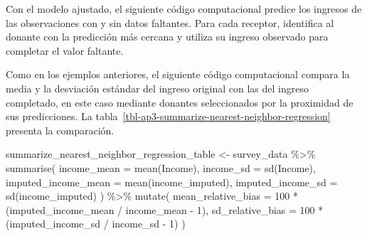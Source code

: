 \documentclass[
  spanish,
  11pt,
  letterpaper,
  oneside,
  open=any]{scrbook}
\newenvironment{Shaded}{\begin{snugshade}}{\end{snugshade}}
\newcommand{\AttributeTok}[1]{\textcolor[rgb]{0.40,0.45,0.13}{#1}}
\newcommand{\ControlFlowTok}[1]{\textcolor[rgb]{0.00,0.23,0.31}{\textbf{#1}}}
\newcommand{\DecValTok}[1]{\textcolor[rgb]{0.68,0.00,0.00}{#1}}
\newcommand{\FunctionTok}[1]{\textcolor[rgb]{0.28,0.35,0.67}{#1}}
\newcommand{\NormalTok}[1]{\textcolor[rgb]{0.00,0.23,0.31}{#1}}
\newcommand{\OtherTok}[1]{\textcolor[rgb]{0.00,0.23,0.31}{#1}}
\newcommand{\SpecialCharTok}[1]{\textcolor[rgb]{0.37,0.37,0.37}{#1}}
\begin{document}
Con el modelo ajustado, el siguiente código computacional predice los
ingresos de las observaciones con y sin datos faltantes. Para cada
receptor, identifica al donante con la predicción más cercana y utiliza
su ingreso observado para completar el valor faltante.

\begin{Shaded}
\end{Shaded}

Como en los ejemplos anteriores, el siguiente código computacional
compara la media y la desviación estándar del ingreso original con las
del ingreso completado, en este caso mediante donantes seleccionados por
la proximidad de sus predicciones. La
tabla~\ref{tbl-ap3-summarize-nearest-neighbor-regression} presenta la
comparación.

\begin{Shaded}
\begin{Highlighting}[]
\NormalTok{summarize\_nearest\_neighbor\_regression\_table }\OtherTok{\textless{}{-}}\NormalTok{ survey\_data }\SpecialCharTok{\%\textgreater{}\%}
  \FunctionTok{summarise}\NormalTok{(}
    \AttributeTok{income\_mean =} \FunctionTok{mean}\NormalTok{(Income),}
    \AttributeTok{income\_sd =} \FunctionTok{sd}\NormalTok{(Income),}
    \AttributeTok{imputed\_income\_mean =} \FunctionTok{mean}\NormalTok{(income\_imputed),}
    \AttributeTok{imputed\_income\_sd =} \FunctionTok{sd}\NormalTok{(income\_imputed)}
\NormalTok{  ) }\SpecialCharTok{\%\textgreater{}\%}
  \FunctionTok{mutate}\NormalTok{(}
    \AttributeTok{mean\_relative\_bias =} \DecValTok{100} \SpecialCharTok{*}\NormalTok{ (imputed\_income\_mean }\SpecialCharTok{/}\NormalTok{ income\_mean }\SpecialCharTok{{-}} \DecValTok{1}\NormalTok{),}
    \AttributeTok{sd\_relative\_bias =} \DecValTok{100} \SpecialCharTok{*}\NormalTok{ (imputed\_income\_sd }\SpecialCharTok{/}\NormalTok{ income\_sd }\SpecialCharTok{{-}} \DecValTok{1}\NormalTok{)}
\NormalTok{  )}
\end{Highlighting}
\end{Shaded}
\end{document}
